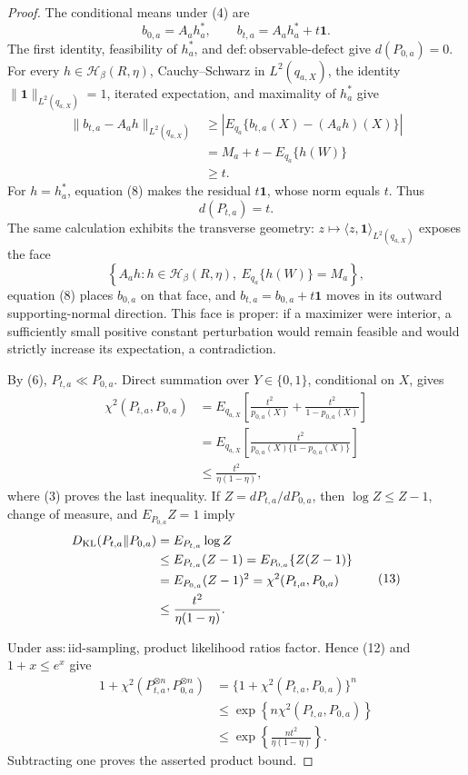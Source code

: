 \documentclass{article}
\begin{document}
\begin{proof}
The conditional means under (4) are
\[
b_{0,a}=A_ah_a^*,
\qquad
b_{t,a}=A_ah_a^*+t\mathbf 1.
\tag{8}
\]
The first identity, feasibility of \(h_a^*\), and \(\mathrm{def:observable\mbox{-}defect}\) give \(d(P_{0,a})=0\). For every \(h\in\mathcal H_\beta(R,\eta)\), Cauchy--Schwarz in \(L^2(q_{a,X})\), the identity \(\|\mathbf1\|_{L^2(q_{a,X})}=1\), iterated expectation, and maximality of \(h_a^*\) give
\[
\begin{aligned}
\|b_{t,a}-A_ah\|_{L^2(q_{a,X})}
&\ge \left|E_{q_a}\{b_{t,a}(X)-(A_ah)(X)\}\right|\\
&=M_a+t-E_{q_a}\{h(W)\}\\
&\ge t.
\end{aligned}
\tag{9}
\]
For \(h=h_a^*\), equation (8) makes the residual \(t\mathbf1\), whose norm equals \(t\). Thus
\[
d(P_{t,a})=t.
\tag{10}
\]
The same calculation exhibits the transverse geometry: \(z\mapsto\langle z,\mathbf1\rangle_{L^2(q_{a,X})}\) exposes the face
\[
\left\{A_ah:h\in\mathcal H_\beta(R,\eta),\ E_{q_a}\{h(W)\}=M_a\right\},
\tag{11}
\]
equation (8) places \(b_{0,a}\) on that face, and \(b_{t,a}=b_{0,a}+t\mathbf1\) moves in its outward supporting-normal direction. This face is proper: if a maximizer were interior, a sufficiently small positive constant perturbation would remain feasible and would strictly increase its expectation, a contradiction.

By (6), \(P_{t,a}\ll P_{0,a}\). Direct summation over \(Y\in\{0,1\}\), conditional on \(X\), gives
\[
\begin{aligned}
\chi^2(P_{t,a},P_{0,a})
&=E_{q_{a,X}}\!\left[
  \frac{t^2}{p_{0,a}(X)}+
  \frac{t^2}{1-p_{0,a}(X)}\right]\\
&=E_{q_{a,X}}\!\left[
  \frac{t^2}{p_{0,a}(X)\{1-p_{0,a}(X)\}}\right]\\
&\le\frac{t^2}{\eta(1-\eta)},
\end{aligned}
\tag{12}
\]
where (3) proves the last inequality. If \(Z=dP_{t,a}/dP_{0,a}\), then \(\log Z\le Z-1\), change of measure, and \(E_{P_{0,a}}Z=1\) imply
\[
\begin{aligned}
D_{\rm KL}(P_{t,a}\|P_{0,a})
&=E_{P_{t,a}}\log Z\\
&\le E_{P_{t,a}}(Z-1)
=E_{P_{0,a}}\{Z(Z-1)\}\\
&=E_{P_{0,a}}(Z-1)^2
=\chi^2(P_{t,a},P_{0,a})\\
&\le\frac{t^2}{\eta(1-\eta)}.
\end{aligned}
\tag{13}
\]

Under \(\mathrm{ass:iid\mbox{-}sampling}\), product likelihood ratios factor. Hence (12) and \(1+x\le e^x\) give
\[
\begin{aligned}
1+\chi^2(P_{t,a}^{\otimes n},P_{0,a}^{\otimes n})
&=\{1+\chi^2(P_{t,a},P_{0,a})\}^n\\
&\le\exp\!\left\{n\chi^2(P_{t,a},P_{0,a})\right\}\\
&\le\exp\!\left\{\frac{nt^2}{\eta(1-\eta)}\right\}.
\end{aligned}
\tag{14}
\]
Subtracting one proves the asserted product bound.


\end{proof}
\end{document}
